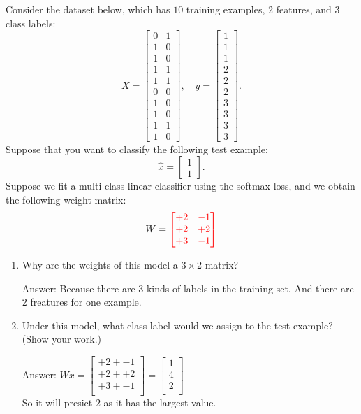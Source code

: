 \documentclass{article}
\def\ans#1{\par\gre{Answer: #1}}
\def\blu#1{{\color{blu}#1}}
\def\gre#1{{\color{gre}#1}}
\def\red#1{{\color{red}#1}}
\def\enum#1{\begin{enumerate}#1\end{enumerate}}
\begin{document}
Consider the dataset below, which has $10$ training examples, $2$ features, and $3$ class labels:
\[
X = \begin{bmatrix}0 & 1\\1 & 0\\ 1 & 0\\ 1 & 1\\ 1 & 1\\ 0 & 0\\  1 & 0\\  1 & 0\\  1 & 1\\  1 &0\end{bmatrix}, \quad y = \begin{bmatrix}1\\1\\1\\2\\2\\2\\3\\3\\3\\3\end{bmatrix}.
\]
Suppose that you want to classify the following test example:
\[
\hat{x} = \begin{bmatrix}1 \\ 1\end{bmatrix}.
\]
Suppose we fit a multi-class linear classifier using the softmax loss, and we obtain the following weight matrix:
\[
W = 
\red{\begin{bmatrix}
+2 & -1\\
+2 & +2\\
+3 & -1\\
\end{bmatrix}}
\]
\blu{
\enum{
\item Why are the weights of this model a \red{$3 \times 2$} matrix? \ans{Because there are 3 kinds of labels in the training set. And there are 2 freatures for one example.}
\item Under this model, what class label would we assign to the test example? (Show your work.) \ans{$Wx= \begin{bmatrix}
    +2 + -1\\
    +2 + +2\\
    +3 + -1\\
    \end{bmatrix} = \begin{bmatrix}
        1\\
        4\\
        2\\
        \end{bmatrix}$ \\
        So it will presict 2 as it has the largest value. }
}}
\end{document}
